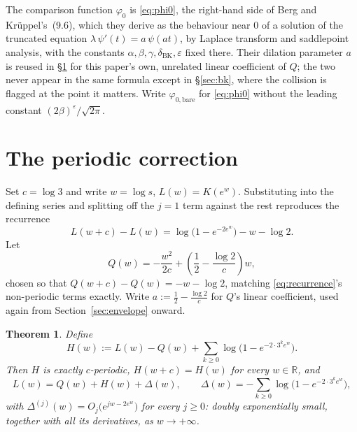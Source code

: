 \documentclass[11pt]{article}
\newtheorem{theorem}{Theorem}[section]
\theoremstyle{definition}
\theoremstyle{remark}
\newcommand{\R}{\mathbb{R}}
\begin{document}
The comparison function $\varphi_0$ is \eqref{eq:phi0}, the right-hand
side of Berg and Kr\"uppel's~(9.6), which they derive as the behaviour
near $0$ of a solution of the truncated equation
$\lambda\,\psi'(t)=a\,\psi(at)$, by Laplace transform and saddlepoint
analysis, with the constants $\alpha,\beta,\gamma,\delta_{\mathrm{BK}},
\varepsilon$ fixed there. Their dilation parameter $a$ is reused in
\S\ref{sec:periodic} for this paper's own, unrelated linear coefficient
of $Q$; the two never appear in the same formula except in
\S\ref{sec:bk}, where the collision is flagged at the point it matters.
Write $\varphi_{0,\mathrm{bare}}$ for \eqref{eq:phi0} without the
leading constant $(2\beta)^\varepsilon/\sqrt{2\pi}$.

\section{The periodic correction}
\label{sec:periodic}

Set $c = \log 3$ and write $w = \log s$, $L(w) = K(e^w)$. Substituting into the defining series and
splitting off the $j=1$ term against the rest reproduces the recurrence
\begin{equation}
\label{eq:recurrence}
L(w+c) - L(w) = \log\bigl(1 - e^{-2e^w}\bigr) - w - \log 2.
\end{equation}
Let
\[
Q(w) = -\frac{w^2}{2c} + \left(\frac12 - \frac{\log 2}{c}\right) w,
\]
chosen so that $Q(w+c) - Q(w) = -w-\log2$, matching \eqref{eq:recurrence}'s non-periodic terms
exactly. Write $a := \tfrac12 - \tfrac{\log 2}{c}$ for $Q$'s linear coefficient, used again from
Section~\ref{sec:envelope} onward.

\begin{theorem}
\label{thm:H}
Define
\begin{equation}
\label{eq:Hexact}
H(w) := L(w) - Q(w) + \sum_{k \ge 0} \log\bigl(1 - e^{-2\cdot 3^k e^w}\bigr).
\end{equation}
Then $H$ is exactly $c$-periodic, $H(w+c) = H(w)$ for every $w \in \R$, and
\[
L(w) = Q(w) + H(w) + \Delta(w), \qquad \Delta(w) = -\sum_{k\ge 0}\log\bigl(1-e^{-2\cdot3^k e^w}\bigr),
\]
with $\Delta^{(j)}(w) = O_j\bigl(e^{jw - 2e^w}\bigr)$ for every $j \ge 0$: doubly exponentially
small, together with all its derivatives, as $w \to +\infty$.
\end{theorem}
\end{document}
